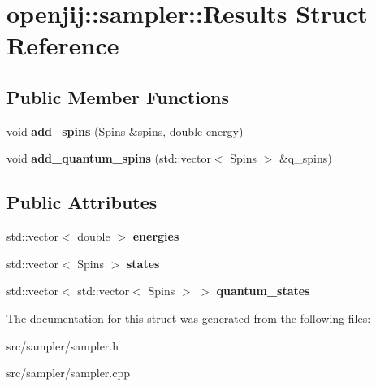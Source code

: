 \hypertarget{structopenjij_1_1sampler_1_1_results}{}\section{openjij\+::sampler\+::Results Struct Reference}
\label{structopenjij_1_1sampler_1_1_results}
\subsection*{Public Member Functions}
\begin{DoxyCompactItemize}
\item 
\mbox{\label{structopenjij_1_1sampler_1_1_results_a76c7645df97de98b884aa99c0f68a438}} 
void {\bfseries add\+\_\+spins} (Spins \&spins, double energy)
\item 
\mbox{\label{structopenjij_1_1sampler_1_1_results_a5e44d8cd52588948e4c6fe485a467f18}} 
void {\bfseries add\+\_\+quantum\+\_\+spins} (std\+::vector$<$ Spins $>$ \&q\+\_\+spins)
\end{DoxyCompactItemize}
\subsection*{Public Attributes}
\begin{DoxyCompactItemize}
\item 
\mbox{\label{structopenjij_1_1sampler_1_1_results_ad15e197c991f3c5851b8b151cd420185}} 
std\+::vector$<$ double $>$ {\bfseries energies}
\item 
\mbox{\label{structopenjij_1_1sampler_1_1_results_a89e693cec17b65e9cfe45ce1ae78f1bf}} 
std\+::vector$<$ Spins $>$ {\bfseries states}
\item 
\mbox{\label{structopenjij_1_1sampler_1_1_results_a7f9140004b61c97430fc69167374bbaf}} 
std\+::vector$<$ std\+::vector$<$ Spins $>$ $>$ {\bfseries quantum\+\_\+states}
\end{DoxyCompactItemize}


The documentation for this struct was generated from the following files\+:\begin{DoxyCompactItemize}
\item 
src/sampler/sampler.\+h\item 
src/sampler/sampler.\+cpp\end{DoxyCompactItemize}
